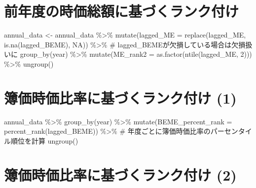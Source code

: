 \documentclass[
  letterpaper,
  DIV=11,
  numbers=noendperiod]{scrreprt}
\newenvironment{Shaded}{\begin{snugshade}}{\end{snugshade}}
\newcommand{\AttributeTok}[1]{\textcolor[rgb]{0.40,0.45,0.13}{#1}}
\newcommand{\CommentTok}[1]{\textcolor[rgb]{0.37,0.37,0.37}{#1}}
\newcommand{\ConstantTok}[1]{\textcolor[rgb]{0.56,0.35,0.01}{#1}}
\newcommand{\DecValTok}[1]{\textcolor[rgb]{0.68,0.00,0.00}{#1}}
\newcommand{\FunctionTok}[1]{\textcolor[rgb]{0.28,0.35,0.67}{#1}}
\newcommand{\NormalTok}[1]{\textcolor[rgb]{0.00,0.23,0.31}{#1}}
\newcommand{\OtherTok}[1]{\textcolor[rgb]{0.00,0.23,0.31}{#1}}
\newcommand{\SpecialCharTok}[1]{\textcolor[rgb]{0.37,0.37,0.37}{#1}}
\begin{document}
\section{前年度の時価総額に基づくランク付け}\label{ux524dux5e74ux5ea6ux306eux6642ux4fa1ux7dcfux984dux306bux57faux3065ux304fux30e9ux30f3ux30afux4ed8ux3051}

\begin{Shaded}
\begin{Highlighting}[]
\NormalTok{annual\_data }\OtherTok{\textless{}{-}}\NormalTok{ annual\_data }\SpecialCharTok{\%\textgreater{}\%} 
  \FunctionTok{mutate}\NormalTok{(}\AttributeTok{lagged\_ME =} \FunctionTok{replace}\NormalTok{(lagged\_ME, }\FunctionTok{is.na}\NormalTok{(lagged\_BEME), }\ConstantTok{NA}\NormalTok{)) }\SpecialCharTok{\%\textgreater{}\%} \CommentTok{\# lagged\_BEMEが欠損している場合は欠損扱いに}
  \FunctionTok{group\_by}\NormalTok{(year) }\SpecialCharTok{\%\textgreater{}\%} 
  \FunctionTok{mutate}\NormalTok{(}\AttributeTok{ME\_rank2 =} \FunctionTok{as.factor}\NormalTok{(}\FunctionTok{ntile}\NormalTok{(lagged\_ME, }\DecValTok{2}\NormalTok{))) }\SpecialCharTok{\%\textgreater{}\%} 
  \FunctionTok{ungroup}\NormalTok{()}
\end{Highlighting}
\end{Shaded}

\section{簿価時価比率に基づくランク付け
(1)}\label{ux7c3fux4fa1ux6642ux4fa1ux6bd4ux7387ux306bux57faux3065ux304fux30e9ux30f3ux30afux4ed8ux3051-1}

\begin{Shaded}
\begin{Highlighting}[]
\NormalTok{annual\_data }\SpecialCharTok{\%\textgreater{}\%} 
  \FunctionTok{group\_by}\NormalTok{(year) }\SpecialCharTok{\%\textgreater{}\%} 
  \FunctionTok{mutate}\NormalTok{(}\AttributeTok{BEME\_percent\_rank =} \FunctionTok{percent\_rank}\NormalTok{(lagged\_BEME)) }\SpecialCharTok{\%\textgreater{}\%} \CommentTok{\# 年度ごとに簿価時価比率のパーセンタイル順位を計算}
  \FunctionTok{ungroup}\NormalTok{()}
\end{Highlighting}
\end{Shaded}

\section{簿価時価比率に基づくランク付け
(2)}\label{ux7c3fux4fa1ux6642ux4fa1ux6bd4ux7387ux306bux57faux3065ux304fux30e9ux30f3ux30afux4ed8ux3051-2}
\end{document}
